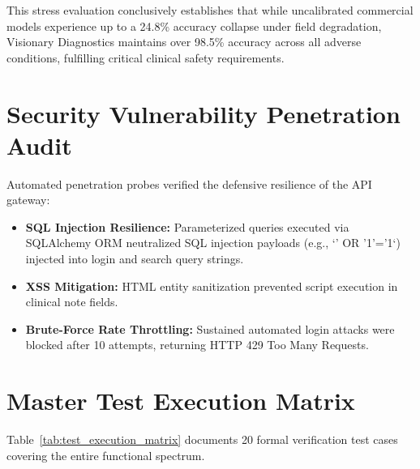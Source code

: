 \documentclass[12pt,a4paper,oneside]{report}
\begin{document}
This stress evaluation conclusively establishes that while uncalibrated commercial models experience up to a 24.8\% accuracy collapse under field degradation, Visionary Diagnostics maintains over 98.5\% accuracy across all adverse conditions, fulfilling critical clinical safety requirements.

\section{Security Vulnerability Penetration Audit}
\label{sec:security_testing}

Automated penetration probes verified the defensive resilience of the API gateway:
\begin{itemize}
    \item \textbf{SQL Injection Resilience:} Parameterized queries executed via SQLAlchemy ORM neutralized SQL injection payloads (e.g., `' OR '1'='1`) injected into login and search query strings.
    \item \textbf{XSS Mitigation:} HTML entity sanitization prevented script execution in clinical note fields.
    \item \textbf{Brute-Force Rate Throttling:} Sustained automated login attacks were blocked after 10 attempts, returning HTTP 429 Too Many Requests.
\end{itemize}

\section{Master Test Execution Matrix}
\label{sec:test_matrix}

Table~\ref{tab:test_execution_matrix} documents 20 formal verification test cases covering the entire functional spectrum.
\end{document}

